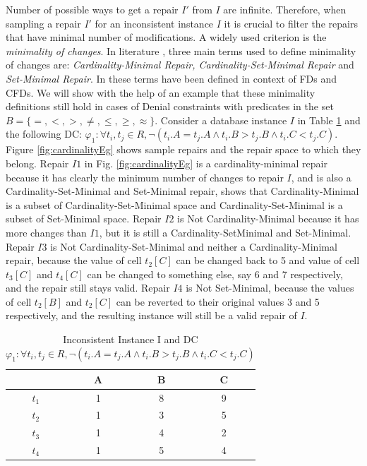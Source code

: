 Number of possible ways to get a repair $I'$ from $I$ are infinite.
Therefore, when sampling a repair $I'$ for an inconsistent instance $I$ it is crucial to filter the repairs that have minimal number of modifications.
A widely used criterion is the \textit{minimality of changes}.
In literature \cite{Bohannon,Kolahi,Chomicki,Greco,Beskales_sampling}, three main terms used to define minimality of changes are:
\textit{Cardinality-Minimal Repair, Cardinality-Set-Minimal Repair} and \textit{ Set-Minimal Repair}.
In \cite{Beskales_journal} these terms have been defined in context of FDs and CFDs.
We will show with the help of an example that these minimality definitions still hold in cases of Denial constraints with predicates in the set $B = \{=, <, >, \neq, \leq, \geq, \approx\}$.
Consider a database instance $I$ in Table \ref{table:eg3} and the following DC: $\varphi _1: \forall t_i,t_j \in R, \neg (t_i.A = t_j.A \wedge t_i.B > t_j.B \wedge t_i.C < t_j.C) $.
Figure \ref{fig:cardinalityEg} shows sample repairs and the repair space to which they belong.
Repair $I1$ in Fig. \ref{fig:cardinalityEg} is a cardinality-minimal repair because it has clearly the minimum number of changes to repair $I$, 
and is also a Cardinality-Set-Minimal and Set-Minimal repair, \cite{Beskales_journal} shows that Cardinality-Minimal is a subset of Cardinality-Set-Minimal space 
and Cardinality-Set-Minimal is a subset of Set-Minimal space.
Repair $I2$ is Not Cardinality-Minimal because it has more changes than $I1$, but it is still a Cardinality-SetMinimal and Set-Minimal.
Repair $I3$ is Not Cardinality-Set-Minimal and neither a Cardinality-Minimal repair, because the value of cell $t_2[C]$ can be changed back to 5 
and value of cell $t_3[C]$ and $t_4[C]$ can be changed to something else, say 6 and 7 respectively, and the repair still stays valid.
Repair $I4$ is Not Set-Minimal, because the values of cell $t_2[B]$ and $t_2[C]$ can be reverted to their original values 3 and 5 respectively, 
and the resulting instance will still be a valid repair of $I$.
\begin{table} 
\centering 
\begin{tabular}{|c|c|c|c|}  \hline
      	 & A & B & C	\\ \hline
   $t_1$ & 1 & 8 & 9 	\\ \hline
   $t_2$ & 1 & 3 & 5  	\\ \hline
   $t_3$ & 1 & 4 & 2 	\\ \hline
   $t_4$ & 1 & 5 & 4 	\\ \hline
\end{tabular}
\caption{Inconsistent Instance I and DC $\varphi _1: \forall t_i,t_j \in R, \neg (t_i.A = t_j.A \wedge t_i.B > t_j.B \wedge t_i.C < t_j.C) $}
\label{table:eg3}
\end{table}

